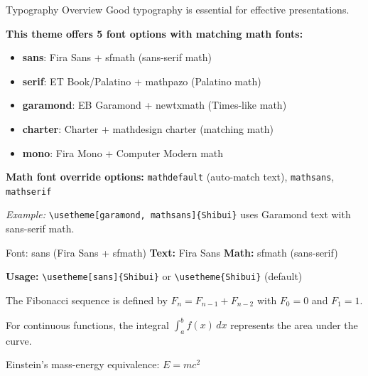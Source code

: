 \documentclass[aspectratio=169]{beamer}
\begin{document}
\begin{frame}{Typography Overview}
  Good typography is essential for effective presentations.

  \vspace{0.5em}

  \textbf{This theme offers 5 font options with matching math fonts:}

  \begin{itemize}
    \item \textbf{sans}: Fira Sans + sfmath (sans-serif math)
    \item \textbf{serif}: ET Book/Palatino + mathpazo (Palatino math)
    \item \textbf{garamond}: EB Garamond + newtxmath (Times-like math)
    \item \textbf{charter}: Charter + mathdesign charter (matching math)
    \item \textbf{mono}: Fira Mono + Computer Modern math
  \end{itemize}

  \vspace{0.5em}

  \textbf{Math font override options:} \texttt{mathdefault} (auto-match text), \texttt{mathsans}, \texttt{mathserif}

  \vspace{0.5em}

  \small \emph{Example:} \texttt{\textbackslash usetheme[garamond, mathsans]\{Shibui\}} uses Garamond text with sans-serif math.
\end{frame}

\begin{frame}{Font: sans (Fira Sans + sfmath)}
  \textbf{Text:} Fira Sans \quad \textbf{Math:} sfmath (sans-serif)

  \vspace{0.5em}

  \textbf{Usage:} \texttt{\textbackslash usetheme[sans]\{Shibui\}} or \texttt{\textbackslash usetheme\{Shibui\}} (default)

  \vspace{1em}

  {\selectfont
  The Fibonacci sequence is defined by $F_n = F_{n-1} + F_{n-2}$ with $F_0 = 0$ and $F_1 = 1$.

  For continuous functions, the integral $\int_a^b f(x)\,dx$ represents the area under the curve.

  Einstein's mass-energy equivalence: $E = mc^2$}
\end{frame}
\end{document}

